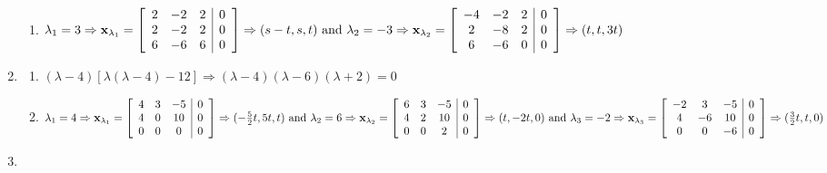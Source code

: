 \documentclass[12pt]{article}
\begin{document}
\begin{enumerate}
\begin{enumerate}
      \item $\lambda_1=3\Rightarrow \bold{x}_{\lambda_1}=\left[ \begin{array}{ccc|c} 2 & -2 & 2 & 0\\ 2 & -2 & 2 & 0\\ 6 & -6 & 6 & 0   \end{array} \right]\Rightarrow (s-t,s,t)\text{ and }\lambda_2=-3\Rightarrow \bold{x}_{\lambda_2}=\left[ \begin{array}{ccc|c} -4 & -2 & 2 & 0\\ 2 & -8 & 2 & 0\\ 6 & -6 & 0 & 0 \end{array} \right]\Rightarrow (t,t,3t)$

    \end{enumerate}

    \setcounter{enumi}{24}

  \item

    \begin{enumerate}

      \item $(\lambda-4)\left[ \lambda(\lambda-4)-12 \right]\Rightarrow (\lambda-4)(\lambda-6)(\lambda+2)=0$

      \item $\lambda_1=4\Rightarrow \bold{x}_{\lambda_1}=\left[ \begin{array}{ccc|c} 4 & 3 & -5 & 0\\ 4 & 0 & 10 & 0\\ 0 & 0 & 0 & 0   \end{array} \right]\Rightarrow (-\frac{5}{2}t,5t,t)\text{ and }\lambda_2=6\Rightarrow \bold{x}_{\lambda_2}=\left[ \begin{array}{ccc|c} 6 & 3 & -5 & 0\\ 4 & 2 & 10 & 0\\ 0 & 0 & 2 & 0 \end{array} \right]\Rightarrow (t,-2t,0)\text{ and }\lambda_3=-2\Rightarrow \bold{x}_{\lambda_3}=\left[ \begin{array}{ccc|c} -2 & 3 & -5 & 0\\ 4 & -6 & 10 & 0\\ 0 & 0 & -6 & 0   \end{array} \right]\Rightarrow (\frac{3}{2}t,t,0)$

    \end{enumerate}

    \setcounter{enumi}{26}

  \item


\end{enumerate}
\end{document}
